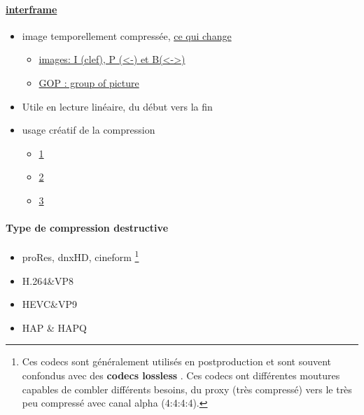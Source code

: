 \documentclass[
  french,
]{book}
\providecommand{\tightlist}{%
  \setlength{\itemsep}{0pt}\setlength{\parskip}{0pt}}
\begin{document}
\hypertarget{interframe}{%
\paragraph{\texorpdfstring{\href{http://users.cs.cf.ac.uk/Dave.Marshall/Multimedia/node249.htmlhttps://en.wikipedia.org/wiki/Inter_frame}{interframe}}{interframe}}\label{interframe}}

\begin{itemize}
\tightlist
\item
  image temporellement compressée, \href{http://dvd-hq.info/data_compression_3.php}{ce qui change}

  \begin{itemize}
  \tightlist
  \item
    \href{https://en.wikipedia.org/wiki/Video_compression_picture_types}{images: I (clef), P (\textless-) et B(\textless-\textgreater)}
  \item
    \href{https://en.wikipedia.org/wiki/Inter_frame\#/media/File:IPB_images_sequence.png}{GOP : group of picture}
  \end{itemize}
\item
  Utile en lecture linéaire, du début vers la fin
\item
  usage créatif de la compression

  \begin{itemize}
  \tightlist
  \item
    \href{https://www.youtube.com/watch?v=rMSsw4CZvKg}{1}
  \item
    \href{https://www.youtube.com/watch?v=rSmEOk5AiN0}{2}
  \item
    \href{https://www.youtube.com/watch?v=dNa0-xrKi3Q}{3}
  \end{itemize}
\end{itemize}

\hypertarget{type-de-compression-destructive}{%
\paragraph{Type de compression destructive}\label{type-de-compression-destructive}}

\begin{itemize}
\tightlist
\item
  proRes, dnxHD, cineform \footnote{Ces codecs sont généralement utilisés en postproduction et sont souvent confondus avec des \textbf{codecs lossless }.
    Ces codecs ont différentes moutures capables de combler différents besoins, du proxy (très compressé) vers le très peu compressé avec canal alpha (4:4:4:4).}
\item
  H.264\&VP8
\item
  HEVC\&VP9\\
\item
  HAP \& HAPQ
\end{itemize}
\end{document}
